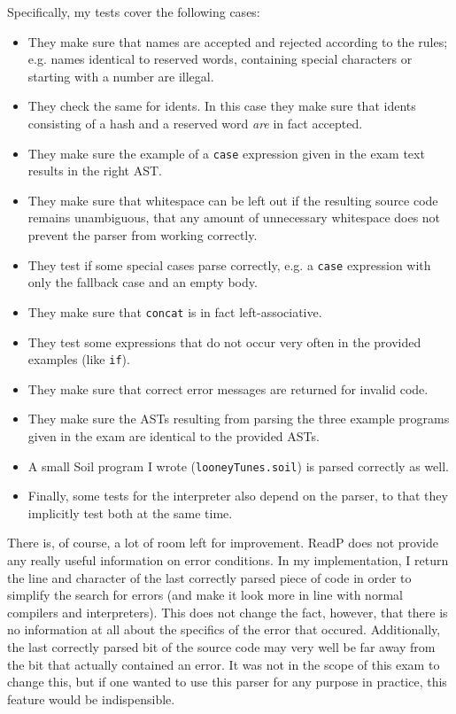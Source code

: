 \documentclass[a4paper]{article}
\begin{document}
Specifically, my tests cover the following cases:
\begin{itemize}
  \item They make sure that names are accepted and rejected according to the rules; e.g. names identical to reserved words, containing special characters or starting with a number are illegal.
  \item They check the same for idents. In this case they make sure that idents consisting of a hash and a reserved word \emph{are} in fact accepted.
  \item They make sure the example of a \texttt{case} expression given in the exam text results in the right AST. 
  \item They make sure that whitespace can be left out if the resulting source code remains unambiguous, that any amount of unnecessary whitespace does not prevent the parser from working correctly.
  \item They test if some special cases parse correctly, e.g. a \texttt{case} expression with only the fallback case and an empty body.
  \item They make sure that \texttt{concat} is in fact left-associative.
  \item They test some expressions that do not occur very often in the provided examples (like \texttt{if}).
  \item They make sure that correct error messages are returned for invalid code.
  \item They make sure the ASTs resulting from parsing the three example programs given in the exam are identical to the provided ASTs.
  \item A small Soil program I wrote (\texttt{looneyTunes.soil}) is parsed correctly as well.
  \item Finally, some tests for the interpreter also depend on the parser, to that they implicitly test both at the same time.
\end{itemize} 

There is, of course, a lot of room left for improvement. ReadP does not provide any really useful information on error conditions. In my implementation, I return the line and character of the last correctly parsed piece of code in order to simplify the search for errors (and make it look more in line with normal compilers and interpreters). This does not change the fact, however, that there is no information at all about the specifics of the error that occured. Additionally, the last correctly parsed bit of the source code may very well be far away from the bit that actually contained an error. It was not in the scope of this exam to change this, but if one wanted to use this parser for any purpose in practice, this feature would be indispensible.
\end{document}
